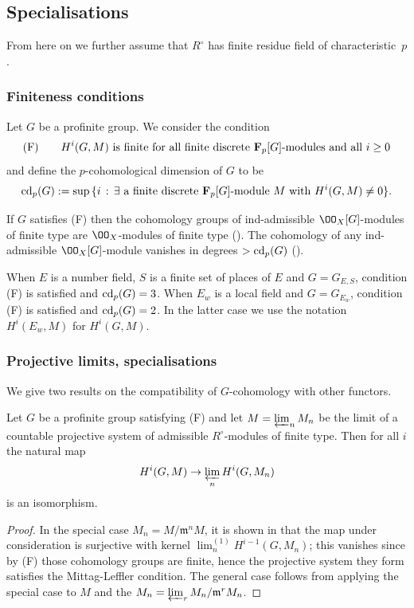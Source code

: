 \subsection{Specialisations}\label{(F)}
From here on we further  assume that $R^{\circ}$ has finite residue field of characteristic~$p$.

\subsubsection{Finiteness conditions}
Let $G$ be a profinite group. We consider the condition
$$\text{(F)}\qquad H^{i}(G, M) \text{ is finite for all finite discrete ${\bf F}_{p}[G]$-modules and all $i\geq 0$}$$
and define the $p$-cohomological dimension of $G$ to be
$${\rm cd}_{p}(G):= \sup\, \{i \, :\, \exists \text{ a finite discrete ${\bf F}_{p}[G]$-module $M$ with } H^{i}(G, M)\neq 0\}.$$
 \begin{lemm}\label{finite coh}
 If $G$ satisfies (F) then the cohomology groups of ind-admissible $\OO_{X}[G]$-modules of finite type are $\OO_{X}$-modules of finite type (\cite[(4.2.5), (4.2.10)]{nek-selmer}).
  The cohomology of any ind-admissible $\OO_{X}[G]$-module vanishes in degrees $>{\rm cd}_{p}(G)$ (\cite[(4.26)]{nek-selmer}).
 \end{lemm}

 When $E$ is a number field, $S$ is a finite set of places of  $E$ and $G=G_{E, S}$,
  condition (F) is satisfied and ${\rm cd}_{p}(G)= 3$. When $E_{w}$ is a local field and $G=G_{E_{w}}$,
   condition (F) is satisfied and ${\rm cd}_{p}(G)= 2 $. In the latter case we use the notation $H^{i}(E_{w}, M) $ for $H^{i}(G, M)$.

\subsubsection{Projective limits, specialisations} We give two  results on the compatibility of  $G$-cohomology  with other functors.


\begin{lemm}\label{projlim ok} Let $ G$ be a profinite group satisfying  (F) and let $M=\varprojlim_{n} M_{n}$ be the limit of  a countable projective system of admissible $R^{\circ}$-modules of finite type. Then for all $i$ the natural map
$$ H^{i}(G, M) \to  \varprojlim_{n} H^{i}(G, M_{n})$$
is an isomorphism.
\end{lemm}
\begin{proof}
In the special case $M_{n}=M/\mathfrak{m}^{n}M$, it is shown in \cite[Corollary 4.1.3]{nek-selmer} that the map under consideration is surjective with kernel $\lim^{(1)}_{n}  H^{i-1}(G, M_{n})$; this vanishes since by (F) those cohomology groups are finite, hence the projective system they form satisfies the Mittag-Leffler condition.  The general case follows from applying the special case to $M$ and the $M_{n}=\varprojlim_{r}M_{n}/\mathfrak{m}^{r}M_{n}$.
\end{proof}

